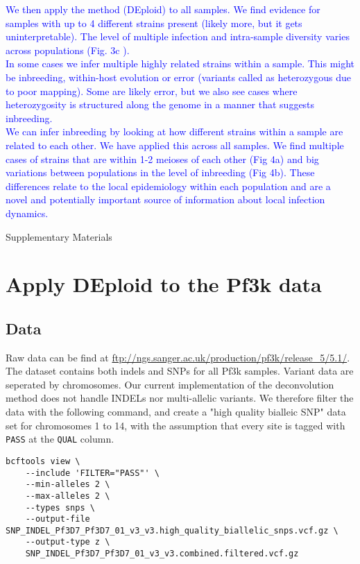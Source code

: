 \documentclass{article}
\begin{document}
\textcolor{blue}{
We then apply the method (DEploid) to all samples.  We find evidence for samples with up to 4 different strains present (likely more, but it gets uninterpretable).  The level of multiple infection and intra-sample diversity varies across populations (Fig. 3c ).\\
In some cases we infer multiple highly related strains within a sample.  This might be inbreeding, within-host evolution or error (variants called as heterozygous due to poor mapping).  Some are likely error, but we also see cases where heterozygosity is structured along the genome in a manner that suggests inbreeding.\\
We can infer inbreeding by looking at how different strains within a sample are related to each other.  We have applied this across all samples.  We find multiple cases of strains that are within 1-2 meioses of each other (Fig 4a) and big variations between populations in the level of inbreeding (Fig 4b).  These differences relate to the local epidemiology within each population and are a novel and potentially important source of information about local infection dynamics.
}

\newpage

\begin{center}
\LARGE
Supplementary Materials
\end{center}



\section{Apply DEploid to the Pf3k data}
\subsection{Data}
Raw data can be find at \url{ftp://ngs.sanger.ac.uk/production/pf3k/release_5/5.1/}. The dataset contains both indels and SNPs for all Pf3k samples. Variant data are seperated by chromosomes. Our current implementation of the deconvolution method \citep{Zhu2017} does not handle INDELs nor multi-allelic variants. We therefore filter the data with the following command, and create a "high quality bialleic SNP" data set for chromosomes 1 to 14, with the assumption that every site is tagged with {\tt PASS} at the {\tt QUAL} column.
\linespread{1}
\begin{lstlisting}
bcftools view \
    --include 'FILTER="PASS"' \
    --min-alleles 2 \
    --max-alleles 2 \
    --types snps \
    --output-file SNP_INDEL_Pf3D7_Pf3D7_01_v3_v3.high_quality_biallelic_snps.vcf.gz \
    --output-type z \
    SNP_INDEL_Pf3D7_Pf3D7_01_v3_v3.combined.filtered.vcf.gz
\end{lstlisting}
\linespread{1.5}
\end{document}
